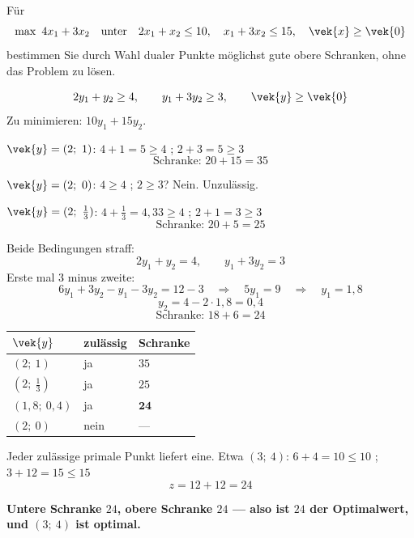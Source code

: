 \begin{aufgabe}
Für
\[ \max\ 4x_1+3x_2 \quad\text{unter}\quad 2x_1+x_2 \le 10,\quad x_1+3x_2 \le 15,\quad \vek{x}\ge\vek{0} \]
bestimmen Sie durch Wahl dualer Punkte möglichst gute obere Schranken, ohne das Problem zu lösen.

\loesung
{}
\[ 2y_1+y_2 \ge 4, \qquad y_1+3y_2 \ge 3, \qquad \vek{y}\ge\vek{0} \]
Zu minimieren: $10y_1+15y_2$.

$\vek{y} = (2;\ 1)$: $4+1 = 5 \ge 4$ \checkmark; $2+3 = 5 \ge 3$ \checkmark
\[ \text{Schranke: } 20+15 = 35 \]

$\vek{y} = (2;\ 0)$: $4 \ge 4$ \checkmark; $2 \ge 3$? \textcolor{akzent}{Nein.} Unzulässig.

$\vek{y} = (2;\ \frac13)$: $4+\frac13 = 4{,}33 \ge 4$ \checkmark; $2+1 = 3 \ge 3$ \checkmark
\[ \text{Schranke: } 20+5 = 25 \]

Beide Bedingungen straff:
\[ 2y_1+y_2 = 4, \qquad y_1+3y_2 = 3 \]
Erste mal $3$ minus zweite:
\[ 6y_1+3y_2 - y_1-3y_2 = 12-3 \quad\Longrightarrow\quad 5y_1 = 9 \quad\Longrightarrow\quad y_1 = 1{,}8 \]
\[ y_2 = 4-2\cdot1{,}8 = 0{,}4 \]
\[ \text{Schranke: } 18+6 = 24 \]

\begin{center}
\renewcommand{\arraystretch}{1.48}
\begin{tabular}{@{}P{2.4cm}P{2.4cm}P{2.4cm}@{}}
\toprule
$\vek{y}$ & \textbf{zulässig} & \textbf{Schranke}\\
\midrule
$(2;\ 1)$ & ja & $35$\\
$(2;\ \tfrac13)$ & ja & $25$\\
$(1{,}8;\ 0{,}4)$ & ja & $\mathbf{24}$\\
$(2;\ 0)$ & \textcolor{akzent}{nein} & ---\\
\bottomrule
\end{tabular}
\end{center}

Jeder zulässige primale Punkt liefert eine. Etwa $(3;\ 4)$: $6+4=10 \le 10$ \checkmark; $3+12 = 15 \le 15$ \checkmark
\[ z = 12+12 = 24 \]

\begin{center}
\begin{minipage}{0.9\textwidth}
\textbf{Untere Schranke $24$, obere Schranke $24$ --- also ist $24$ der Optimalwert, und $(3;\ 4)$ ist optimal.}
\end{minipage}
\end{center}


\end{aufgabe}
